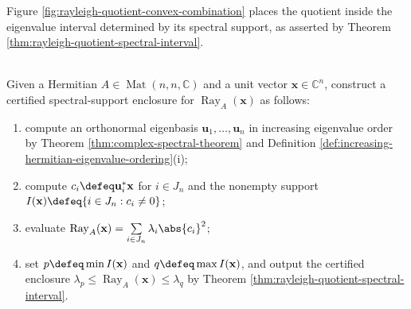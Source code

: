 Figure \ref{fig:rayleigh-quotient-convex-combination} places the quotient inside the eigenvalue interval determined by its spectral support, as asserted by Theorem \ref{thm:rayleigh-quotient-spectral-interval}.

\begin{illustrationfigure}[H]
  \centering
  
  \caption{For ordered orthonormal eigenpairs of a Hermitian $A$, a unit vector supported on $\mathbf{u}_p,\ldots,\mathbf{u}_q$ has $\operatorname{Ray}_A(\mathbf{x})\in[\lambda_p,\lambda_q]$.}
  \label{fig:rayleigh-quotient-convex-combination}
\end{illustrationfigure}

\begin{computationmethod} \label{meth:rayleigh-eigenbasis-method} \\
Given a Hermitian $A\in\operatorname{Mat}(n,n,\mathbb{C})$ and a unit vector $\mathbf{x}\in\mathbb{C}^n$, construct a certified spectral-support enclosure for $\operatorname{Ray}_A(\mathbf{x})$ as follows:
\begin{enumerate}[label=(\roman*)]
\setlength{\itemsep}{0pt}
\item compute an orthonormal eigenbasis $\mathbf{u}_1,\ldots,\mathbf{u}_n$ in increasing eigenvalue order by Theorem \ref{thm:complex-spectral-theorem} and Definition \ref{def:increasing-hermitian-eigenvalue-ordering}(i);
\item compute $c_i\defeq\mathbf{u}_i^*\mathbf{x}$ for $i\in J_n$ and the nonempty support $I(\mathbf{x})\defeq\{i\in J_n:c_i\neq0\}$;
\item evaluate $\operatorname{Ray}_A(\mathbf{x})=\sum\limits_{i\in J_n}\lambda_i\abs{c_i}^2$;
\item set $p\defeq\min I(\mathbf{x})$ and $q\defeq\max I(\mathbf{x})$, and output the certified enclosure $\lambda_p\leq\operatorname{Ray}_A(\mathbf{x})\leq\lambda_q$ by Theorem \ref{thm:rayleigh-quotient-spectral-interval}.
\end{enumerate}
\end{computationmethod}

